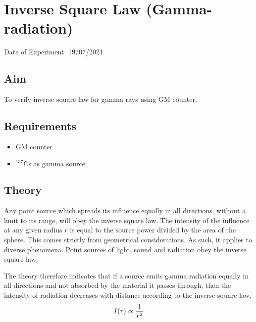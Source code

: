 
	
	
	\chapter{Inverse Square Law (Gamma-radiation)}
	\vspace{-1cm}
	\begin{center}%
		Date of Experiment: 19/07/2021
	\end{center}
	\section{Aim}
	To verify inverse square law for gamma rays using GM counter.
	
	\section{Requirements}
	\begin{itemize}
		\item 	GM counter
		\item 	$ ^{137} $Cs as gamma source
	\end{itemize}
	
	\section{Theory}
	Any point source which spreads its influence equally in all directions, without a limit to its range, will obey the inverse square law. The intensity of the influence at any given radius $ r $ is equal to the source power divided by the area of the sphere. This comes strictly from geometrical considerations. As such, it applies to diverse phenomena. Point sources of light, sound and radiation obey the inverse square law.
	
	The theory therefore indicates that if a source emits gamma radiation equally in all directions and not absorbed by the material it passes through, then the intensity of radiation decreases with distance according to the inverse square law,
	\begin{equation}{\label{eqn:inv-sq-law}}
		I(r) \propto \dfrac{1}{r^2}
	\end{equation}
	

